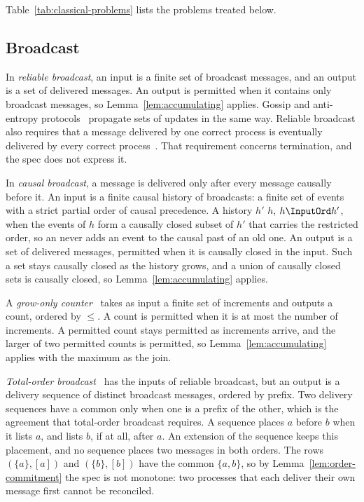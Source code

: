 Table~\ref{tab:classical-problems} lists the problems treated below.

\subsection{Broadcast}
\label{app:broadcast}

In \emph{reliable broadcast}, an input is a finite set of broadcast messages,
and an output is a set of delivered messages.  An output is permitted when it
contains only broadcast messages, so Lemma~\ref{lem:accumulating} applies.
Gossip and anti-entropy protocols~\cite{demers1987epidemic} propagate sets of
updates in the same way.  Reliable broadcast also requires that a message
delivered by one correct process is eventually delivered by every correct
process~\cite{hadzilacos1994modular}.  That requirement concerns termination,
and the spec does not express it.

In \emph{causal broadcast}, a message is delivered only after every message
causally before it.  An input is a finite causal history of broadcasts: a
finite set of events with a strict partial order of causal precedence.  A
history $h'$ \inrel $h$, $h\InputOrd h'$, when the events of $h$ form a
causally closed subset of $h'$ that carries the restricted order, so an
\indesc never adds an event to the causal past of an old one.  An output is a
set of delivered messages, permitted when it is causally closed in the input.
Such a set stays causally closed as the history grows, and a union of causally
closed sets is causally closed, so Lemma~\ref{lem:accumulating} applies.

A \emph{grow-only counter}~\cite{shapiro2011crdt} takes as input a finite set
of increments and outputs a count, ordered by $\leq$.  A count is permitted
when it is at most the number of increments.  A permitted count stays
permitted as increments arrive, and the larger of two permitted counts is
permitted, so Lemma~\ref{lem:accumulating} applies with the maximum as the join.

\emph{Total-order broadcast}~\cite{defago2004total} has the inputs of reliable
broadcast, but an output is a delivery sequence of distinct broadcast
messages, ordered by prefix.  Two delivery sequences have a common \outnoun
only when one is a prefix of the other, which is the agreement that
total-order broadcast requires.  A sequence places $a$ before $b$ when it lists
$a$, and lists $b$, if at all, after $a$.  An extension of the sequence keeps
this placement, and no sequence places two messages in both orders.  The rows
$(\{a\},[a])$ and $(\{b\},[b])$ have the common \indesc $\{a,b\}$, so by
Lemma~\ref{lem:order-commitment} the spec is not monotone: two processes that
each deliver their own message first cannot be reconciled.

